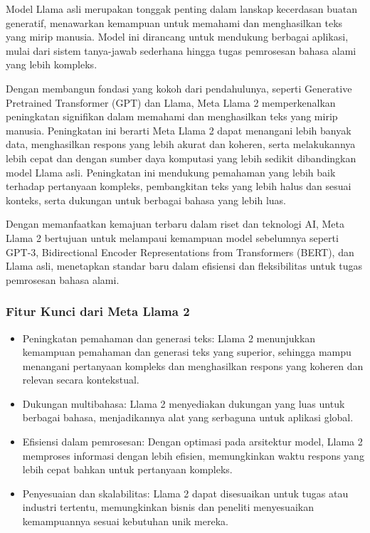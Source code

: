 \documentclass{article}
\begin{document}
Model Llama asli merupakan tonggak penting dalam lanskap kecerdasan buatan generatif, menawarkan kemampuan untuk memahami dan menghasilkan teks yang mirip manusia. Model ini dirancang untuk mendukung berbagai aplikasi, mulai dari sistem tanya-jawab sederhana hingga tugas pemrosesan bahasa alami yang lebih kompleks.

Dengan membangun fondasi yang kokoh dari pendahulunya, seperti Generative Pretrained Transformer (GPT) dan Llama, Meta Llama 2 memperkenalkan peningkatan signifikan dalam memahami dan menghasilkan teks yang mirip manusia. Peningkatan ini berarti Meta Llama 2 dapat menangani lebih banyak data, menghasilkan respons yang lebih akurat dan koheren, serta melakukannya lebih cepat dan dengan sumber daya komputasi yang lebih sedikit dibandingkan model Llama asli. Peningkatan ini mendukung pemahaman yang lebih baik terhadap pertanyaan kompleks, pembangkitan teks yang lebih halus dan sesuai konteks, serta dukungan untuk berbagai bahasa yang lebih luas.

Dengan memanfaatkan kemajuan terbaru dalam riset dan teknologi AI, Meta Llama 2 bertujuan untuk melampaui kemampuan model sebelumnya seperti GPT-3, Bidirectional Encoder Representations from Transformers (BERT), dan Llama asli, menetapkan standar baru dalam efisiensi dan fleksibilitas untuk tugas pemrosesan bahasa alami.

\subsubsection{Fitur Kunci dari Meta Llama 2}
\begin{itemize}
    \item Peningkatan pemahaman dan generasi teks: Llama 2 menunjukkan kemampuan pemahaman dan generasi teks yang superior, sehingga mampu menangani pertanyaan kompleks dan menghasilkan respons yang koheren dan relevan secara kontekstual.
    \item Dukungan multibahasa: Llama 2 menyediakan dukungan yang luas untuk berbagai bahasa, menjadikannya alat yang serbaguna untuk aplikasi global.
    \item Efisiensi dalam pemrosesan: Dengan optimasi pada arsitektur model, Llama 2 memproses informasi dengan lebih efisien, memungkinkan waktu respons yang lebih cepat bahkan untuk pertanyaan kompleks.
    \item Penyesuaian dan skalabilitas: Llama 2 dapat disesuaikan untuk tugas atau industri tertentu, memungkinkan bisnis dan peneliti menyesuaikan kemampuannya sesuai kebutuhan unik mereka.
\end{itemize}
\end{document}
